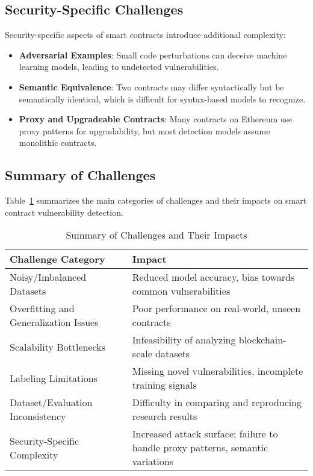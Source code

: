\subsection*{Security-Specific Challenges}

Security-specific aspects of smart contracts introduce additional complexity:

\begin{itemize}
    \item \textbf{Adversarial Examples}: Small code perturbations can deceive machine learning models, leading to undetected vulnerabilities.
    
    \item \textbf{Semantic Equivalence}: Two contracts may differ syntactically but be semantically identical, which is difficult for syntax-based models to recognize.
    
    \item \textbf{Proxy and Upgradeable Contracts}: Many contracts on Ethereum use proxy patterns for upgradability, but most detection models assume monolithic contracts.
\end{itemize}

\subsection*{Summary of Challenges}

Table~\ref{tab:challenges_summary} summarizes the main categories of challenges and their impacts on smart contract vulnerability detection.

\begin{table}[H]
\centering
\small
\renewcommand{\arraystretch}{1.3}

\begin{tabular}{|p{4.5cm}|p{7cm}|}
\hline
\textbf{Challenge Category} & \textbf{Impact} \\
\hline
Noisy/Imbalanced Datasets & Reduced model accuracy, bias towards common vulnerabilities \\
\hline
Overfitting and Generalization Issues & Poor performance on real-world, unseen contracts \\
\hline
Scalability Bottlenecks & Infeasibility of analyzing blockchain-scale datasets \\
\hline
Labeling Limitations & Missing novel vulnerabilities, incomplete training signals \\
\hline
Dataset/Evaluation Inconsistency & Difficulty in comparing and reproducing research results \\
\hline
Security-Specific Complexity & Increased attack surface; failure to handle proxy patterns, semantic variations \\
\hline
\end{tabular}
\caption{Summary of Challenges and Their Impacts}
\label{tab:challenges_summary}
\end{table}

